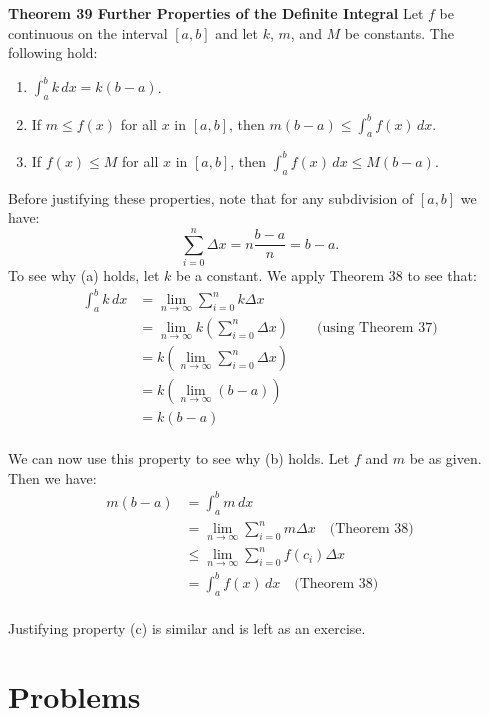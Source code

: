 \documentclass[11pt]{report}
\begin{document}
\begin{enumerate}
{{\bfseries Theorem 39 \quad Further Properties of the Definite Integral}
Let $f$ be continuous on the interval $[a,b]$ and let $k$, $m$, and $M$ be constants. The following hold:
\begin{enumerate}
\item $\displaystyle\int_a^b k\,dx=k(b-a)$.
\item If $m\leq f(x)$ for all $x$ in $[a,b]$, then $m(b-a)\leq \displaystyle\int_a^b f(x)\,dx$.
\item If $f(x)\leq M$ for all $x$ in $[a,b]$, then $\displaystyle\int_a^b f(x)\,dx\leq M(b-a)$.
\end{enumerate}

Before justifying these properties, note that for any subdivision of $[a,b]$ we have: \[\sum_{i=0}^n \Delta x=n\frac{b-a}n=b-a.\]
To see why (a) holds, let $k$ be a constant. We apply Theorem 38 to see that:
\begin{equation*}
\begin{split}
\int_a^b k\,dx &=\lim_{n\to\infty}\sum_{i=0}^{n} k\Delta x\\
&=\lim_{n\to\infty}k\left( \sum_{i=0}^n \Delta x\right) \qquad \text{(using Theorem 37)}\\
&=k\left(\lim_{n\to\infty}\sum_{i=0}^n \Delta x\right)\\
&=k\left( \lim_{n\to\infty} (b-a)\right)\\
&=k(b-a)\\
\end{split}
\end{equation*}

We can now use this property to see why (b) holds. Let $f$ and $m$ be as given. Then we have:
\begin{equation*}
\begin{split}
m(b-a)&=\int_a^b m\,dx \\
&=\lim_{n\to\infty}\sum_{i=0}^n m\Delta x \quad\text{(Theorem 38)}\\
&\leq \lim_{n\to\infty}\sum_{i=0}^n f(c_i)\Delta x\\
&=\int_a^b f(x)\,dx \quad\text{(Theorem 38)}\\
\end{split}
\end{equation*}

Justifying property (c) is similar and is left as an exercise.

}


\end{enumerate}

\section*{Problems}
\end{document}
